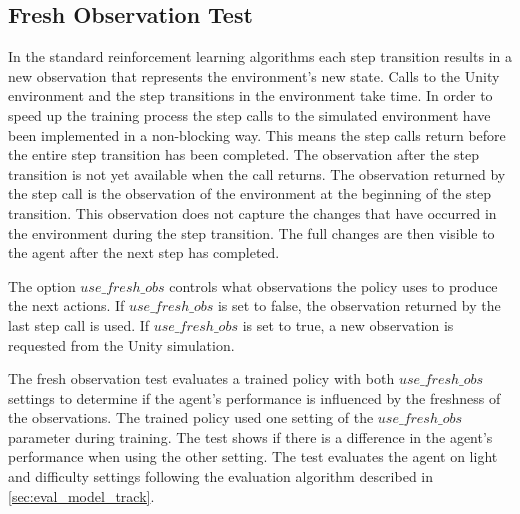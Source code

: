 \subsection{Fresh Observation Test}

In the standard reinforcement learning algorithms each step transition results in a new observation that represents the environment's new state. Calls to the Unity environment and the step transitions in the environment take time. In order to speed up the training process the step calls to the simulated environment have been implemented in a non-blocking way. This means the step calls return before the entire step transition has been completed. The observation after the step transition is not yet available when the call returns. The observation returned by the step call is the observation of the environment at the beginning of the step transition. This observation does not capture the changes that have occurred in the environment during the step transition. The full changes are then visible to the agent after the next step has completed. 

The option $use\_fresh\_obs$ controls what observations the policy uses to produce the next actions. If $use\_fresh\_obs$ is set to false, the observation returned by the last step call is used. If $use\_fresh\_obs$ is set to true, a new observation is requested from the Unity simulation.

The fresh observation test evaluates a trained policy with both $use\_fresh\_obs$ settings to determine if the agent's performance is influenced by the freshness of the observations. The trained policy used one setting of the $use\_fresh\_obs$ parameter during training. The test shows if there is a difference in the agent's performance when using the other setting. The test evaluates the agent on light and difficulty settings following the evaluation algorithm described in \ref{sec:eval_model_track}.


 






